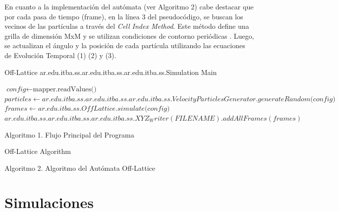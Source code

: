 \documentclass[12pt, a4paper]{report}
\makeatletter
\def\BState{\State\hskip-\ALG@thistlm}
\makeatother
\begin{document}
En cuanto a la implementación del autómata (ver Algoritmo 2) cabe destacar que por cada pasa de tiempo (frame), en la línea 3 del pseudocódigo, se buscan los vecinos de las partículas a través del \emph{Cell Index Method}. Este método define una grilla de dimensión MxM y se utilizan condiciones de contorno periódicas \cite{cellIndex}.
Luego, se actualizan el ángulo y la posición de cada partícula utilizando las ecuaciones de Evolución Temporal (1) (2) y (3). 

\pagebreak
\begin{algorithm}
    \caption{Off-Lattice ar.edu.itba.ss.ar.edu.itba.ss.ar.edu.itba.ss.Simulation Main}\label{main}
    \begin{algorithmic}[1]
    \State $\textit{config} \gets \text{mapper.readValues()}$
    \State $particles \gets \textit{ar.edu.itba.ss.ar.edu.itba.ss.ar.edu.itba.ss.VelocityParticlesGenerator.generateRandom(config)}$
    \State $frames \gets \textit{ar.edu.itba.ss.OffLattice.simulate(config)}$
    \State $ar.edu.itba.ss.ar.edu.itba.ss.ar.edu.itba.ss.XYZ_Writer(FILENAME).addAllFrames(frames)$
    \EndProcedure
    \end{algorithmic}
\end{algorithm}
\begin{center}
Algoritmo 1. Flujo Principal del Programa
\end{center}

\begin{algorithm}
    \caption{Off-Lattice Algorithm}\label{offLattice}
\end{algorithm}
\begin{center}
Algoritmo 2. Algoritmo del Autómata Off-Lattice
\end{center}

\section{Simulaciones}
\end{document}
